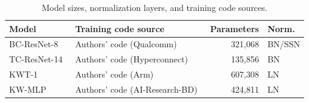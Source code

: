 \begin{table}[H]
	\caption{Model sizes, normalization layers, and training code sources.}
	\label{tab:source_models}
	\centering\small
	\begin{tabularx}{\textwidth}{l>{\raggedright\arraybackslash}Xrl}
		\toprule
		Model & Training code source & Parameters & Norm. \\
		\midrule
		BC-ResNet-8~\cite{kim2021bcresnet} & Authors' code (Qualcomm)~\cite{bccode}
		& 321,068 & BN/SSN \\
		TC-ResNet-14~\cite{choi2019tcresnet} & Authors' code (Hyperconnect)~\cite{tcresnetcode}
		& 135,856 & BN \\
		KWT-1~\cite{berg2021kwt} & Authors' code (Arm)~\cite{kwtcode}
		& 607,308 & LN \\
		KW-MLP~\cite{morshed2022kwmlp} & Authors' code (AI-Research-BD)~\cite{kwmlpcode}
		& 424,811 & LN \\
		\bottomrule
	\end{tabularx}
\end{table}
